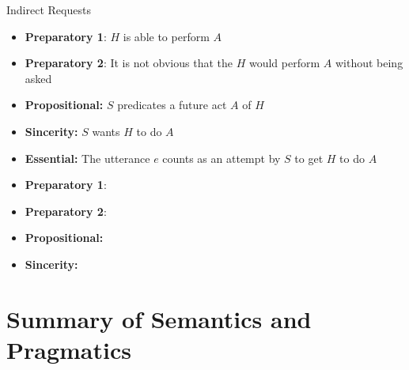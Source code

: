 \documentclass{beamer}
\begin{document}
\begin{frame}{Indirect Requests}

  \begin{itemize}
\item \textbf{Preparatory 1}: $H$ is able to perform  $A$
\item \textbf{Preparatory 2}: It is not obvious that the $H$ would perform $A$  without being asked
\item \textbf{Propositional:} $S$ predicates a future act $A$ of $H$
\item \textbf{Sincerity:}  $S$ wants $H$ to do $A$ 
\item \textbf{Essential:} The utterance $e$ counts as an attempt by $S$ to get $H$ to do $A$
\end{itemize}
  \begin{itemize}
\item \textbf{Preparatory 1}: 
\item \textbf{Preparatory 2}: 
\item \textbf{Propositional:} 
\item \textbf{Sincerity:}  
\end{itemize}


\end{frame}

\section{Summary of Semantics and Pragmatics}
\end{document}
